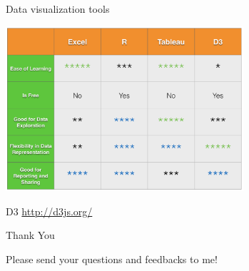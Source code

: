 \documentclass[10pt]{beamer}
\begin{document}
    \begin{frame}{Data visualization tools}
      \begin{center}
         \includegraphics[width=250pt]{../graphs/data_visualization_tools}
      \end{center}
      {\footnotesize
        D3 \url{http://d3js.org/}
      }
    \end{frame}
     
    \begin{frame}{Thank You}
      \centerline{\large Please send your questions and feedbacks to me!}
    \end{frame}
\end{document}
